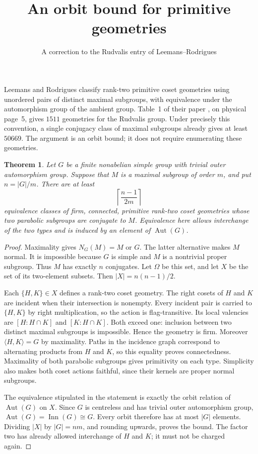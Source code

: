 \documentclass[11pt]{article}
\title{An orbit bound for primitive geometries}
\author{A correction to the Rudvalis entry of Leemans--Rodrigues}
\date{}
\newtheorem{theorem}{Theorem}
\newcommand{\Aut}{\operatorname{Aut}}
\begin{document}
\maketitle
Leemans and Rodrigues classify rank-two primitive coset geometries using
unordered pairs of distinct maximal subgroups, with equivalence under
the automorphism group of the ambient group. Table~1 of their paper
\cite{LR}, on physical page~5, gives $1511$ geometries for the Rudvalis
group. Under precisely this convention, a single conjugacy class of
maximal subgroups already gives at least $50669$. The argument is an
orbit bound; it does not require enumerating these geometries.

\begin{theorem}\label{bound}
Let $G$ be a finite nonabelian simple group with trivial outer
automorphism group. Suppose that $M$ is a maximal subgroup of order $m$,
and put $n=|G|/m$. There are at least
\[
                   \left\lceil\frac{n-1}{2m}\right\rceil
\]
equivalence classes of firm, connected, primitive rank-two coset
geometries whose two parabolic subgroups are conjugate to $M$.
Equivalence here allows interchange of the two types and is induced
by an element of $\Aut(G)$.
\end{theorem}
\begin{proof}
Maximality gives $N_G(M)=M$ or $G$. The latter alternative makes $M$
normal. It is impossible because $G$ is simple and $M$ is a nontrivial
proper subgroup. Thus $M$ has exactly $n$ conjugates. Let $\Omega$ be
this set, and let $X$ be the set of its two-element subsets. Then
$|X|=n(n-1)/2$.

Each $\{H,K\}\in X$ defines a rank-two coset geometry. The right cosets
of $H$ and $K$ are incident when their intersection is nonempty. Every
incident pair is carried to $\{H,K\}$ by right multiplication, so the
action is flag-transitive. Its local valencies are
$[H:H\cap K]$ and $[K:H\cap K]$. Both exceed one: inclusion between
two distinct maximal subgroups is impossible. Hence the geometry is
firm. Moreover $\langle H,K\rangle=G$ by maximality. Paths in the
incidence graph correspond to alternating products from $H$ and $K$,
so this equality proves connectedness. Maximality of both parabolic
subgroups gives primitivity on each type. Simplicity also makes both
coset actions faithful, since their kernels are proper normal subgroups.

The equivalence stipulated in the statement is exactly the orbit
relation of $\Aut(G)$ on $X$. Since $G$ is centreless and has trivial
outer automorphism group, $\Aut(G)=\operatorname{Inn}(G)\cong G$.
Every orbit therefore has at most $|G|$ elements. Dividing $|X|$ by
$|G|=nm$, and rounding upwards, proves the bound. The factor two has
already allowed interchange of $H$ and $K$; it must not be charged again.
\end{proof}
\end{document}
